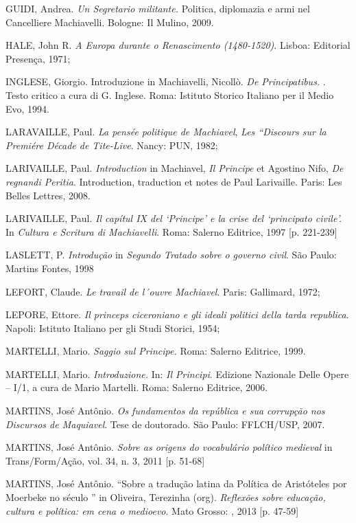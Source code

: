 \begin{Parskip}
GUIDI, Andrea. \emph{Un Segretario militante.} Politica, diplomazia e
armi nel Cancelliere Machiavelli. Bologne: Il Mulino, 2009.

HALE, John R. \emph{A Europa durante o Renascimento (1480-1520)}.
Lisboa: Editorial Presença, 1971;

INGLESE, Giorgio. Introduzione in Machiavelli, Nicollò. \emph{De
Principatibus.} . Testo critico a cura di G. Inglese. Roma: Istituto
Storico Italiano per il Medio Evo, 1994.

LARAVAILLE, Paul. \emph{La pensée politique de Machiavel}, \emph{Les
``Discours sur la Premiére Décade de Tite-Live}. Nancy: PUN, 1982;

LARIVAILLE, Paul. \emph{Introduction} in Machiavel, \emph{Il Principe}
et Agostino Nifo, \emph{De regnandi Peritia}. Introduction, traduction
et notes de Paul Larivaille. Paris: Les Belles Lettres, 2008.

LARIVAILLE, Paul. \emph{Il capítul IX del `Principe' e la crise del
`principato civile'.} In \emph{Cultura e Scritura di Machiavelli}. Roma:
Salerno Editrice, 1997 {[}p. 221-239{]}

LASLETT, P. \emph{Introdução} in \emph{Segundo Tratado sobre o governo
civil}. São Paulo: Martins Fontes, 1998

LEFORT, Claude. \emph{Le travail de l´ouvre Machiavel}. Paris:
Gallimard, 1972;

LEPORE, Ettore. \emph{Il princeps ciceroniano e gli ideali politici
della tarda republica}. Napoli: Istituto Italiano per gli Studi Storici,
1954;

MARTELLI, Mario. \emph{Saggio sul Principe.} Roma: Salerno Editrice,
1999.

MARTELLI, Mario. \emph{Introduzione.} In: \emph{Il Principi}. Edizione
Nazionale Delle Opere -- I/1, a cura de Mario Martelli. Roma: Salerno
Editrice, 2006.

MARTINS, José Antônio. \emph{Os fundamentos da república e sua corrupção
nos Discursos de Maquiavel}. Tese de doutorado. São Paulo: FFLCH/USP,
2007.

MARTINS, José Antônio. \emph{Sobre as origens do vocabulário político
medieval} in Trans/Form/Ação, vol. 34, n. 3, 2011 {[}p. 51-68{]}

MARTINS, José Antônio. ``Sobre a tradução latina da Política de Aristóteles por Moerbeke no século '' in Oliveira, Terezinha (org). \emph{Reflexões sobre educação, cultura e política: em cena o medioevo}. Mato Grosso: , 2013 {[}p. 47-59{]}


\end{Parskip}
